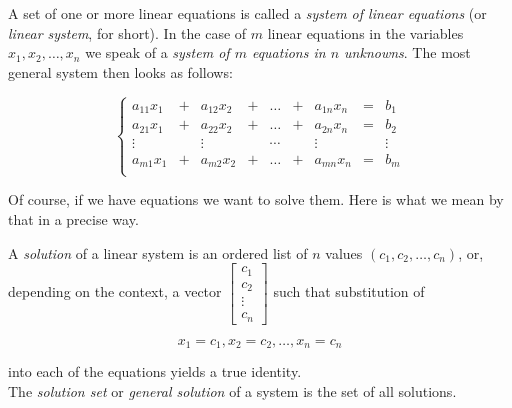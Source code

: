 \begin{dfn}
\label{Dfn:LinSystems:LinearSystem}
A set of one or more linear equations is called a  \emph{system of linear equations}  (or \emph{linear system}, for short). In the case of $m$ linear equations in the variables $x_1,x_2,\ldots, x_n$ we speak of a \emph{system of $m$ equations in $n$ unknowns}.
The most general system then looks as follows:

$$

   \left\{
\begin{array}{ccccccccc}
            a_{11}x_1\! & \!+\!&\!a_{12}x_2\! & \!+\!&\! \ldots\! & \!+\!&\!a_{1n}x_n  \! & \!=\!&\!  b_1 \\
            a_{21}x_1 \! & \!+\!&\!a_{22}x_2\! & \!+\!&\!\ldots\! & \!+\!&\!a_{2n}x_n  \! & \!=\!&\! b_2 \\
           
            \vdots \! & \! \!&\!  \vdots\! & \! \!&\!\cdots\! & \! \!&\! \vdots     \! & \! \!&\!  \vdots \\
            a_{m1}x_1 \! & \!+\!&\!a_{m2}x_2\! & \!+\!&\! \ldots\! & \!+\!&\!a_{mn}x_n \! & \!=\!&\! b_m \\
          \end{array}
   \right.
$$

\end{dfn}

Of course, if we have equations we want to solve them.  Here is what we mean by that in a precise way. 


\begin{dfn}
\label{Dfn:LinSystems:SolutionOfLinearSystem}
A \emph{solution} of a linear system  is an ordered list of $n$  values  $(c_1,  c_2, \ldots, c_n)$, or, depending on the context, a vector
$
\begin{bmatrix}c_1 \\ c_2 \\ \vdots \\ c_n  \end{bmatrix}$  such that substitution of

$$

 x_1 = c_1, x_2 = c_2, \ldots, x_n = c_n
$$

into each of the equations yields  a true identity.\\
The \emph{solution set} or \emph{general solution} of a system is the set of all solutions.
\end{dfn}



